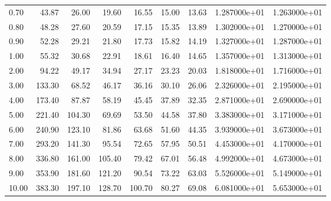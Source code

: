 \begin{tabular}{lrrrrrrrr}
0.70  &   43.87 &    26.00 &     19.60 &      16.55 &     15.00 &        13.63 &  1.287000e+01 &  1.263000e+01 \\
0.80  &   48.28 &    27.60 &     20.59 &      17.15 &     15.35 &        13.89 &  1.302000e+01 &  1.270000e+01 \\
0.90  &   52.28 &    29.21 &     21.80 &      17.73 &     15.82 &        14.19 &  1.327000e+01 &  1.287000e+01 \\
1.00  &   55.32 &    30.68 &     22.91 &      18.61 &     16.40 &        14.65 &  1.357000e+01 &  1.313000e+01 \\
2.00  &   94.22 &    49.17 &     34.94 &      27.17 &     23.23 &        20.03 &  1.818000e+01 &  1.716000e+01 \\
3.00  &  133.30 &    68.52 &     46.17 &      36.16 &     30.10 &        26.06 &  2.326000e+01 &  2.195000e+01 \\
4.00  &  173.40 &    87.87 &     58.19 &      45.45 &     37.89 &        32.35 &  2.871000e+01 &  2.690000e+01 \\
5.00  &  221.40 &   104.30 &     69.69 &      53.50 &     44.58 &        37.80 &  3.383000e+01 &  3.171000e+01 \\
6.00  &  240.90 &   123.10 &     81.86 &      63.68 &     51.60 &        44.35 &  3.939000e+01 &  3.673000e+01 \\
7.00  &  293.20 &   141.30 &     95.54 &      72.65 &     57.95 &        50.51 &  4.453000e+01 &  4.170000e+01 \\
8.00  &  336.80 &   161.00 &    105.40 &      79.42 &     67.01 &        56.48 &  4.992000e+01 &  4.673000e+01 \\
9.00  &  353.90 &   181.60 &    121.20 &      90.54 &     73.22 &        63.03 &  5.526000e+01 &  5.149000e+01 \\
10.00 &  383.30 &   197.10 &    128.70 &     100.70 &     80.27 &        69.08 &  6.081000e+01 &  5.653000e+01 \\
\bottomrule
\end{tabular}
